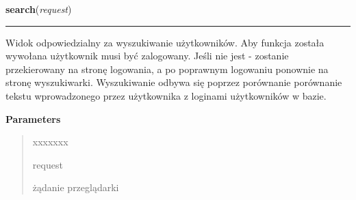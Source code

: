 \hspace{.8\funcindent}\begin{boxedminipage}{\funcwidth}

    \raggedright \textbf{search}(\textit{request})

    \vspace{-1.5ex}

    \rule{\textwidth}{0.5\fboxrule}
\setlength{\parskip}{2ex}
    Widok odpowiedzialny za wyszukiwanie użytkowników. Aby funkcja została 
    wywołana użytkownik musi być zalogowany. Jeśli nie jest - zostanie 
    przekierowany na stronę logowania, a po poprawnym logowaniu ponownie na
    stronę wyszukiwarki. Wyszukiwanie odbywa się poprzez porównanie 
    porównanie tekstu wprowadzonego przez użytkownika z loginami 
    użytkowników w bazie.

\setlength{\parskip}{1ex}
      \textbf{Parameters}
      \vspace{-1ex}

      \begin{quote}
        \begin{Ventry}{xxxxxxx}

          \item[request]

          żądanie przeglądarki

        \end{Ventry}

      \end{quote}

    \end{boxedminipage}

    \label{ass8_portal:accounts:views:profile_edit}

    \vspace{0.5ex}

